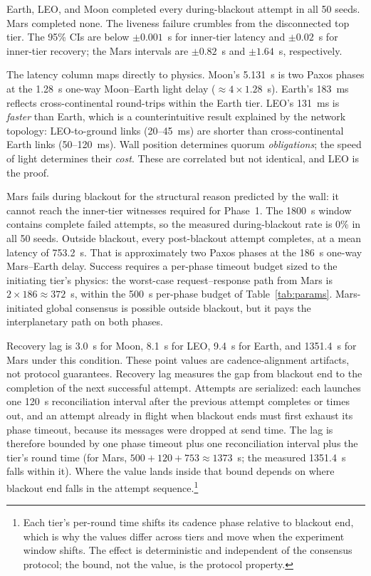 \documentclass[letterpaper,twocolumn,10pt]{article}
\newcounter{prop}
\newcounter{cor}
\begin{document}
Earth, LEO, and Moon completed every during-blackout attempt in all 50 seeds. Mars completed none. The liveness failure crumbles from the disconnected top tier. The 95\% CIs are below $\pm 0.001$~s for inner-tier latency and $\pm 0.02$~s for inner-tier recovery; the Mars intervals are $\pm 0.82$~s and $\pm 1.64$~s, respectively.

The latency column maps directly to physics. Moon's 5.131~s is two Paxos phases at the 1.28~s one-way Moon--Earth light delay ($\approx 4 \times 1.28$~s). Earth's 183~ms reflects cross-continental round-trips within the Earth tier. LEO's 131~ms is \emph{faster} than Earth, which is a counterintuitive result explained by the network topology: LEO-to-ground links (20--45~ms) are shorter than cross-continental Earth links (50--120~ms). Wall position determines quorum \emph{obligations}; the speed of light determines their \emph{cost}. These are correlated but not identical, and LEO is the proof.

Mars fails during blackout for the structural reason predicted by the wall: it cannot reach the inner-tier witnesses required for Phase~1. The 1800~s window contains complete failed attempts, so the measured during-blackout rate is 0\% in all 50 seeds. Outside blackout, every post-blackout attempt completes, at a mean latency of 753.2~s. That is approximately two Paxos phases at the 186~s one-way Mars--Earth delay. Success requires a per-phase timeout budget sized to the initiating tier's physics: the worst-case request--response path from Mars is $2 \times 186 \approx 372$~s, within the 500~s per-phase budget of Table~\ref{tab:params}. Mars-initiated global consensus is possible outside blackout, but it pays the interplanetary path on both phases.

Recovery lag is 3.0~s for Moon, 8.1~s for LEO, 9.4~s for Earth, and 1351.4~s for Mars under this condition. These point values are cadence-alignment artifacts, not protocol guarantees. Recovery lag measures the gap from blackout end to the completion of the next successful attempt. Attempts are serialized: each launches one 120~s reconciliation interval after the previous attempt completes or times out, and an attempt already in flight when blackout ends must first exhaust its phase timeout, because its messages were dropped at send time. The lag is therefore bounded by one phase timeout plus one reconciliation interval plus the tier's round time (for Mars, $500+120+753 \approx 1373$~s; the measured 1351.4~s falls within it). Where the value lands inside that bound depends on where blackout end falls in the attempt sequence.\footnote{Each tier's per-round time shifts its cadence phase relative to blackout end, which is why the values differ across tiers and move when the experiment window shifts. The effect is deterministic and independent of the consensus protocol; the bound, not the value, is the protocol property.}
\end{document}
